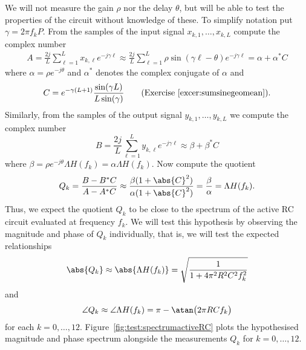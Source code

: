 \begin{test}
We will not measure the gain $\rho$ nor the delay $\theta$, but will be able to test the properties of the circuit without knowledge of these.  To simplify notation put $\gamma = 2\pi f_k P$.  From the samples of the input signal $x_{k,1},\dots,x_{k,L}$ compute the complex number
\begin{align*}
A = \frac{2j}{L}\sum_{\ell=1}^{L} x_{k,\ell} e^{-j \gamma \ell} 
\approx \frac{2j}{L}\sum_{\ell=1}^{L} \rho \sin( \gamma \ell - \theta)  e^{-j \gamma \ell} 
= \alpha + \alpha^* C
\end{align*}
where $\alpha = \rho e^{- j \theta}$ and $\alpha^*$ denotes the complex conjugate of $\alpha$ and
\[
C = e^{-\gamma (L+1)} \frac{  \sin( \gamma L)  }{L \sin(\gamma)  } \qquad \text{(Exercise~\ref{excer:sumsinegeomean})} .
\]
Similarly, from the samples of the output signal $y_{k,1},\dots,y_{k,L}$ we compute the complex number
\[
B = \frac{2j}{L}\sum_{\ell=1}^{L} y_{k,\ell} e^{-j \gamma\ell} \approx \beta + \beta^*C
\]
where $\beta = \rho  e^{-j\theta} \Lambda H(f_k) = \alpha \Lambda H(f_k)$.  Now compute the quotient
\[
Q_k = \frac{B - B^* C}{A - A^* C} \approx \frac{\beta (1 + \abs{C}^2)}{\alpha (1 + \abs{C}^2)} = \frac{\beta}{\alpha} = \Lambda H(f_k).
\]
Thus, we expect the quotient $Q_k$ to be close to the spectrum of the active RC circuit evaluated at frequency $f_k$.  We will test this hypothesis by observing the magnitude and phase of $Q_k$ individually, that is, we will test the expected relationships
\[
\abs{Q_k} \approx \abs{\Lambda H(f_k)} = \sqrt{\frac{1}{1 + 4\pi^2 R^2 C^2 f_k^2}}
\]
and
\[
\angle Q_k \approx \angle \Lambda H(f_k) = \pi - \atan\big( 2\pi R C f_k \big)
\]
for each $k = 0,\dots,12$.  Figure~\ref{fig:test:spectrumactiveRC} plots the hypothesised magnitude and phase spectrum alongside the measurements $Q_k$ for $k = 0, \dots, 12$.

\end{test}

